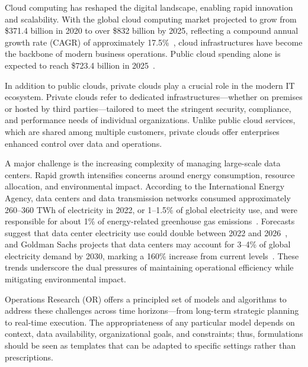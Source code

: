 \documentclass[pdflatex,sn-mathphys-num]{sn-jnl}
\theoremstyle{thmstyleone}
\theoremstyle{thmstyletwo}
\theoremstyle{thmstylethree}
\begin{document}
Cloud computing has reshaped the digital landscape, enabling rapid innovation and scalability. With the global cloud computing market projected to grow from \$371.4 billion in 2020 to over \$832 billion by 2025, reflecting a compound annual growth rate (CAGR) of approximately 17.5\%~\cite{researchmarkets2020}, cloud infrastructures have become the backbone of modern business operations. Public cloud spending alone is expected to reach \$723.4 billion in 2025~\cite{gartner2024}.

In addition to public clouds, private clouds play a crucial role in the modern IT ecosystem. Private clouds refer to dedicated infrastructures—whether on premises or hosted by third parties—tailored to meet the stringent security, compliance, and performance needs of individual organizations. Unlike public cloud services, which are shared among multiple customers, private clouds offer enterprises enhanced control over data and operations.

A major challenge is the increasing complexity of managing large-scale data centers. Rapid growth intensifies concerns around energy consumption, resource allocation, and environmental impact. According to the International Energy Agency, data centers and data transmission networks consumed approximately 260–360 TWh of electricity in 2022, or 1–1.5\% of global electricity use, and were responsible for about 1\% of energy-related greenhouse gas emissions~\cite{iea2023}. Forecasts suggest that data center electricity use could double between 2022 and 2026~\cite{iea2024}, and Goldman Sachs projects that data centers may account for 3–4\% of global electricity demand by 2030, marking a 160\% increase from current levels~\cite{goldman2023}. These trends underscore the dual pressures of maintaining operational efficiency while mitigating environmental impact.

Operations Research (OR) offers a principled set of models and algorithms to address these challenges across time horizons—from long-term strategic planning to real-time execution. The appropriateness of any particular model depends on context, data availability, organizational goals, and constraints; thus, formulations should be seen as templates that can be adapted to specific settings rather than prescriptions. 
 
\end{document}
